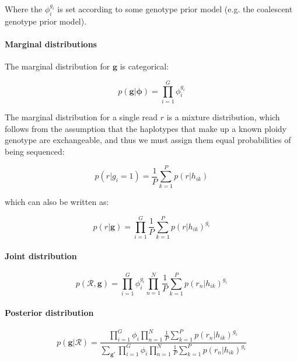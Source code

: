 \documentclass{article}
\begin{document}
Where the $\phi_i^{g_i}$ is set according to some genotype prior model (e.g. the coalescent genotype prior model).

\paragraph{Marginal distributions}

The marginal distribution for $\boldsymbol{g}$ is categorical:

\begin{equation}
\label{eq:ind_g_marginal}
    p(\boldsymbol{g} | \boldsymbol{\phi}) = \prod_{i = 1}^G \phi_i^{g_i}
\end{equation}

The marginal distribution for a single read $r$ is a mixture distribution, which follows from the assumption that the haplotypes that make up a known ploidy genotype are exchangeable, and thus we must assign them equal probabilities of being sequenced:

\begin{equation}
\label{eq:ind_read_marginal}
 p(r | g_i = 1) = \frac{1}{P} \sum^P_{k = 1} p(r | h_{ik})
\end{equation}

which can also be written as:

\begin{equation}
\label{eq:ind_read_marginal2}
 p(r | \boldsymbol{g}) = \prod_{i = 1}^G \frac{1}{P} \sum^P_{k = 1} p(r | h_{ik})^{g_i}
\end{equation}

\paragraph{Joint distribution}

\begin{equation}
\label{eq:ind_jp}
 p(\mathcal{R}, \boldsymbol{g}) = \prod_{i = 1}^G \phi_i^{g_i} \prod^N_{n = 1} \frac{1}{P} \sum^P_{k = 1} p(r_n | h_{ik})^{g_i}
\end{equation}

\paragraph{Posterior distribution}

\begin{equation}
\label{eq:ind_post}
 p(\boldsymbol{g} | \mathcal{R}) = \frac{\prod_{i = 1}^G \phi_i \prod^N_{n = 1} \frac{1}{P} \sum^P_{k = 1} p(r_n | h_{ik})^{g_i}}{\sum_{\boldsymbol{g}'}\prod_{i = 1}^G \phi_i \prod^N_{n = 1} \frac{1}{P} \sum^P_{k = 1} p(r_n | h_{ik})^{g_i}}
\end{equation}
\end{document}
